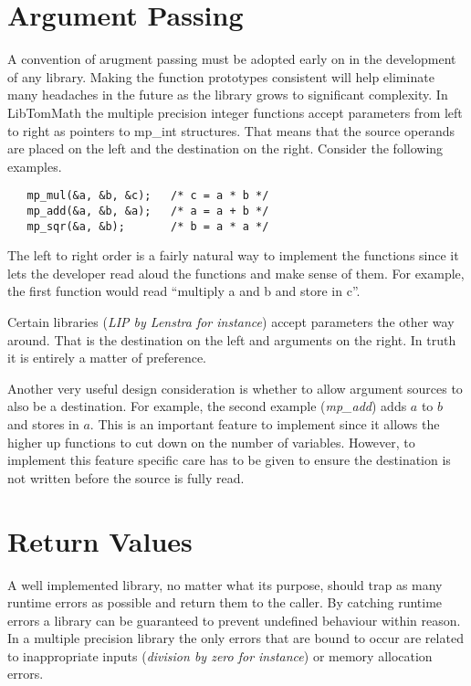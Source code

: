 \documentclass[b5paper]{book}
\begin{document}
\section{Argument Passing}
A convention of arugment passing must be adopted early on in the development of any library.  Making the function prototypes
consistent will help eliminate many headaches in the future as the library grows to significant complexity.  In LibTomMath the multiple precision 
integer functions accept parameters from left to right as pointers to mp\_int structures.  That means that the source operands are 
placed on the left and the destination on the right.   Consider the following examples.

\begin{verbatim}
   mp_mul(&a, &b, &c);   /* c = a * b */
   mp_add(&a, &b, &a);   /* a = a + b */
   mp_sqr(&a, &b);       /* b = a * a */
\end{verbatim}

The left to right order is a fairly natural way to implement the functions since it lets the developer read aloud the
functions and make sense of them.  For example, the first function would read ``multiply a and b and store in c''.

Certain libraries (\textit{LIP by Lenstra for instance}) accept parameters the other way around.  That is the destination
on the left and arguments on the right.  In truth it is entirely a matter of preference.  

Another very useful design consideration is whether to allow argument sources to also be a destination.  For example, the
second example (\textit{mp\_add}) adds $a$ to $b$ and stores in $a$.  This is an important feature to implement since it
allows the higher up functions to cut down on the number of variables.  However, to implement this feature specific
care has to be given to ensure the destination is not written before the source is fully read.

\section{Return Values}
A well implemented library, no matter what its purpose, should trap as many runtime errors as possible and return them to the 
caller.  By catching runtime errors a library can be guaranteed to prevent undefined behaviour within reason.  In a multiple precision 
library the only errors that are bound to occur are related to inappropriate inputs (\textit{division by zero for instance}) or 
memory allocation errors.
\end{document}
